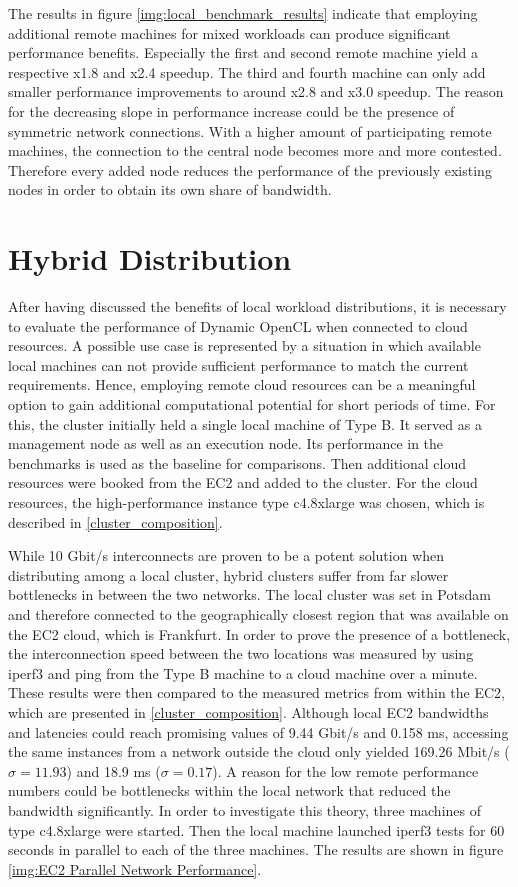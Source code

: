 The results in figure \ref{img:local_benchmark_results} indicate that employing additional remote machines for mixed workloads can produce significant performance benefits. Especially the first and second remote machine yield a respective x1.8 and x2.4 speedup. The third and fourth machine can only add smaller performance improvements to around x2.8 and x3.0 speedup. The reason for the decreasing slope in performance increase could be the presence of symmetric network connections. With a higher amount of participating remote machines, the connection to the central node becomes more and more contested. Therefore every added node reduces the performance of the previously existing nodes in order to obtain its own share of bandwidth.


\section{Hybrid Distribution}

After having discussed the benefits of local workload distributions, it is necessary to evaluate the performance of Dynamic OpenCL when connected to cloud resources. A possible use case is represented by a situation in which available local machines can not provide sufficient performance to match the current requirements. Hence, employing remote cloud resources can be a meaningful option to gain additional computational potential for short periods of time. For this, the cluster initially held a single local machine of Type B. It served as a management node as well as an execution node. Its performance in the benchmarks is used as the baseline for comparisons. Then additional cloud resources were booked from the EC2 and added to the cluster. For the cloud resources, the high-performance instance type c4.8xlarge was chosen, which is described in \ref{cluster_composition}.

While 10 Gbit/s interconnects are proven to be a potent solution when distributing among a local cluster, hybrid clusters suffer from far slower bottlenecks in between the two networks. The local cluster was set in Potsdam and therefore connected to the geographically closest region that was available on the EC2 cloud, which is Frankfurt. In order to prove the presence of a bottleneck, the interconnection speed between the two locations was measured by using iperf3 and ping from the Type B machine to a cloud machine over a minute. These results were then compared to the measured metrics from within the EC2, which are presented in \ref{cluster_composition}. Although local EC2 bandwidths and latencies could reach promising values of 9.44 Gbit/s and 0.158 ms, accessing the same instances from a network outside the cloud only yielded 169.26 Mbit/s ($\sigma = 11.93$) and 18.9 ms ($\sigma = 0.17$). A reason for the low remote performance numbers could be bottlenecks within the local network that reduced the bandwidth significantly. In order to investigate this theory, three machines of type c4.8xlarge were started. Then the local machine launched iperf3 tests for 60 seconds in parallel to each of the three machines. The results are shown in figure \ref{img:EC2 Parallel Network Performance}.

